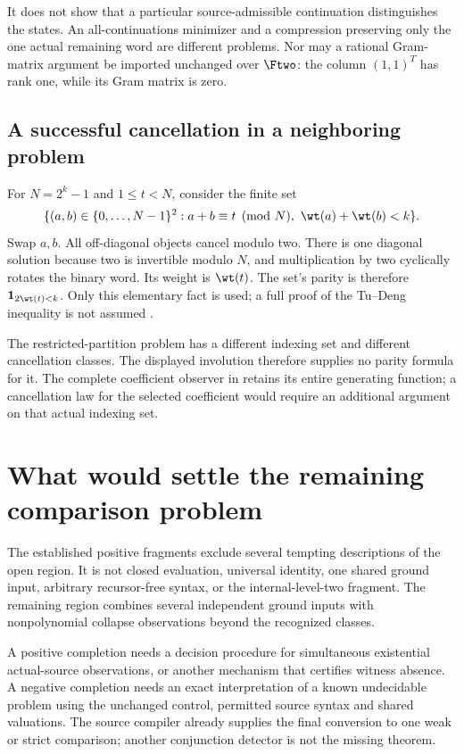 \documentclass[11pt,a4paper]{article}
\begin{document}
It does not show that a particular source-admissible continuation distinguishes
the states.  An all-continuations minimizer and a compression preserving only
the one actual remaining word are different problems.  Nor may a rational
Gram-matrix argument be imported unchanged over $\Ftwo$: the column
$(1,1)^T$ has rank one, while its Gram matrix is zero.

\subsection{A successful cancellation in a neighboring problem}
For $N=2^k-1$ and $1\le t<N$, consider the finite set
\[
 \{(a,b)\in\{0,\ldots,N-1\}^2:
       a+b\equiv t\pmod N,\ \wt(a)+\wt(b)<k\}.
\]
Swap $a,b$.  All off-diagonal objects cancel modulo two.  There is one
diagonal solution because two is invertible modulo $N$, and multiplication
by two cyclically rotates the binary word.  Its weight is $\wt(t)$.
The set's parity is therefore $\mathbf1_{2\wt(t)<k}$.
Only this elementary fact is used; a full proof of the Tu--Deng inequality
is not assumed \cite{llx}.

The restricted-partition problem has a different indexing set and different
cancellation classes.  The displayed involution therefore supplies no parity
formula for it.  The complete coefficient observer in \cite{wwcounts}
retains its entire generating function; a cancellation law for the selected
coefficient would require an additional argument on that actual indexing set.

\section{What would settle the remaining comparison problem}

The established positive fragments exclude several tempting descriptions of
the open region.  It is not closed evaluation, universal identity, one shared
ground input, arbitrary recursor-free syntax, or the internal-level-two
fragment.  The remaining region combines several independent ground inputs
with nonpolynomial collapse observations beyond the recognized classes.

A positive completion needs a decision procedure for simultaneous existential
actual-source observations, or another mechanism that certifies witness
absence.  A negative completion needs an exact interpretation of a known
undecidable problem using the unchanged control, permitted source syntax and
shared valuations.  The source compiler already supplies the final conversion
to one weak or strict comparison; another conjunction detector is not the
missing theorem.
\end{document}
